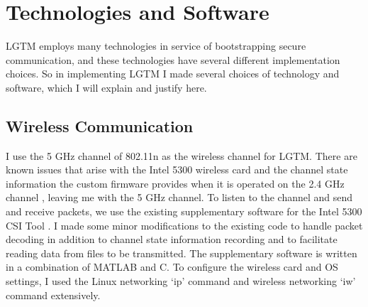 \documentclass[12pt]{report}
\begin{document}


\section{Technologies and Software}

LGTM employs many technologies in service of bootstrapping secure communication, and these technologies have several different implementation choices. So in implementing LGTM I made several choices of technology and software, which I will explain and justify here. \par

\subsection{Wireless Communication}
I use the 5 GHz channel of 802.11n as the wireless channel for LGTM. There are known issues that arise with the Intel 5300 wireless card and the channel state information the custom firmware provides when it is operated on the 2.4 GHz channel \cite{PhaserGjengset2014,SpotFiKotaru2015}, leaving me with the 5 GHz channel. To listen to the channel and send and receive packets, we use the existing supplementary software for the Intel 5300 CSI Tool \cite{ChannelStateInformationToolReleaseHalperin2011}. I made some minor modifications to the existing code to handle packet decoding in addition to channel state information recording and to facilitate reading data from files to be transmitted. The supplementary software is written in a combination of MATLAB and C. To configure the wireless card and OS settings, I used the Linux networking `ip' command and wireless networking `iw' command extensively. \par
\end{document}
